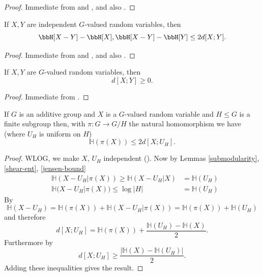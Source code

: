 \begin{proof}  \leanok Immediate from  and , and also .
\end{proof}

\begin{lemma}\label{ruzsa-growth}
  \leanok
  If $X,Y$ are independent $G$-valued random variables, then
$$  \bbH[X-Y] - \bbH[X], \bbH[X-Y] - \bbH[Y] \leq 2d[X ;Y].$$
\end{lemma}

\begin{proof}  \leanok Immediate from  and , and also .
\end{proof}

\begin{lemma}\label{ruzsa-nonneg}
  \leanok
  If $X,Y$ are $G$-valued random variables, then
  $$ d[X ;Y] \geq 0.$$
\end{lemma}

\begin{proof}
  \leanok
  Immediate from .
\end{proof}


\begin{lemma}\label{dist-projection}\leanok
If $G$ is an additive group and $X$ is a $G$-valued random variable and $H\leq G$ is a finite subgroup then, with $\pi:G\to G/H$ the natural homomorphism we have (where $U_H$ is uniform on $H$)
\[\mathbb{H}(\pi(X))\leq 2d[X;U_H].\]
\end{lemma}
\begin{proof}
\leanok
WLOG, we make $X$, $U_H$ independent ().
Now by Lemmas \ref{submodularity}, \ref{shear-ent}, \ref{jensen-bound}
\begin{align*}
&\mathbb{H}(X-U_H|\pi(X)) \geq \mathbb{H}(X-U_H|X) &= \mathbb{H}(U_H) \\
&\mathbb{H}(X-U_H|\pi(X)) \leq \log |H| &= \mathbb{H}(U_H)
\end{align*}
By 
\[\mathbb{H}(X-U_H)=\mathbb{H}(\pi(X))+\mathbb{H}(X-U_H|\pi(X))=\mathbb{H}(\pi(X))+\mathbb{H}(U_H)\]
and therefore
\[d[X;U_H]=\mathbb{H}(\pi(X))+\frac{\mathbb{H}(U_H)-\mathbb{H}(X)}{2}.\]
Furthermore by 
\[d[X;U_H]\geq \frac{\lvert \mathbb{H}(X)-\mathbb{H}(U_H)\rvert}{2}.\]
Adding these inequalities gives the result.
\end{proof}

